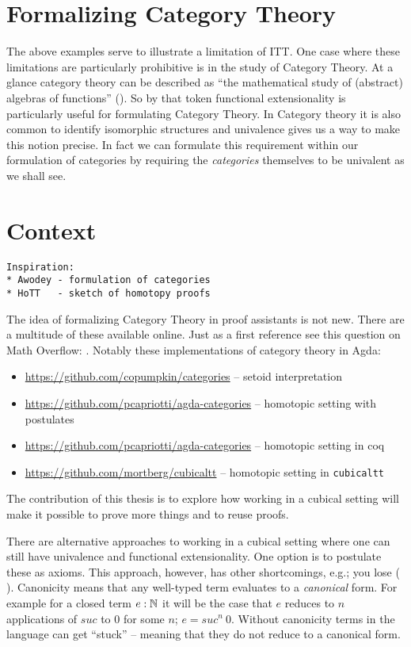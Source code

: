 \section{Formalizing Category Theory}
%
The above examples serve to illustrate a limitation of ITT. One case where these
limitations are particularly prohibitive is in the study of Category Theory. At
a glance category theory can be described as ``the mathematical study of
(abstract) algebras of functions'' (\cite{awodey-2006}). So by that token
functional extensionality is particularly useful for formulating Category
Theory. In Category theory it is also common to identify isomorphic structures
and univalence gives us a way to make this notion precise. In fact we can
formulate this requirement within our formulation of categories by requiring the
\emph{categories} themselves to be univalent as we shall see.

\section{Context}
%
\begin{verbatim}
Inspiration:
* Awodey - formulation of categories
* HoTT   - sketch of homotopy proofs
\end{verbatim}
The idea of formalizing Category Theory in proof assistants is not new. There
are a multitude of these available online. Just as a first reference see this
question on Math Overflow: \cite{mo-formalizations}. Notably these
implementations of category theory in Agda:
\begin{itemize}
\item
\url{https://github.com/copumpkin/categories} -- setoid interpretation
\item
\url{https://github.com/pcapriotti/agda-categories} -- homotopic setting with postulates
\item
\url{https://github.com/pcapriotti/agda-categories} -- homotopic setting in coq
\item
\url{https://github.com/mortberg/cubicaltt} -- homotopic setting in \texttt{cubicaltt}
\end{itemize}

The contribution of this thesis is to explore how working in a cubical setting
will make it possible to prove more things and to reuse proofs.

There are alternative approaches to working in a cubical setting where one can
still have univalence and functional extensionality. One option is to postulate
these as axioms. This approach, however, has other shortcomings, e.g.; you lose
 ( \cite{huber-2016}). Canonicity means that any
well-typed term evaluates to a \emph{canonical} form. For example for a closed
term $e : \mathbb{N}$ it will be the case that $e$ reduces to $n$ applications of
$\mathit{suc}$ to $0$ for some $n$; $e = \mathit{suc}^n\ 0$. Without canonicity
terms in the language can get ``stuck'' -- meaning that they do not reduce to a
canonical form.

